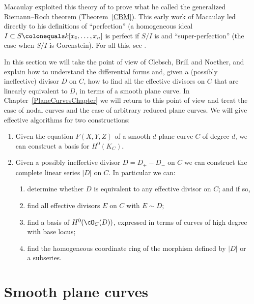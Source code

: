 Macaulay exploited this theory of 
%
to prove what he called
the generalized Riemann--Roch theorem
%
%
(Theorem~\ref{CBM}). This
early work of Mac\-aulay led directly to his definitions of
%
``perfection'' (a homogeneous ideal 
$I  \subset S\colonequals k[x_0, \dots, x_n]$ is perfect if $S/I$ is 
%
and ``super-perfection'' (the case when $S/I$ is
%
%
Gorenstein). For all this, see \cite{eisenbud-gray}.

In this section we will take the point of view of Clebsch, Brill and Noether, and explain how to understand 
the differential forms and, given a (possibly ineffective) divisor $D$ on $C$, how to find all the 
effective divisors on $C$ that are linearly equivalent to $D$, in terms of a smooth plane curve. In Chapter~\ref{PlaneCurvesChapter} we will return to this point of view and treat the case of
nodal curves and the case of arbitrary reduced plane curves. We will give effective algorithms for
two constructions:

\begin{enumerate}
\item Given the equation $F(X,Y,Z)$ of a smooth $d$ plane curve $C$
of degree $d$, we can
construct a basis for $H^0(K_C)$. 
\item  Given a possibly ineffective divisor $D = D_{+}-D_{-}$ on $C$ we can construct the complete linear series $|D|$ on $C$. In particular we can:
\begin{enumerate}
\item determine whether $D$ is equivalent to any effective divisor on $C$; and if so,
 \item find all effective divisors $E$ on $C$ with $E \sim D$;
 \item find a basis of $H^0(\cO_C(D))$, expressed in terms of curves of high degree with  
%
base locus;
 \item find the homogeneous coordinate ring of the morphism defined by $|D|$ or a subseries.
\end{enumerate}
\end{enumerate}

\section{Smooth plane curves}\label{smooth plane curves}

